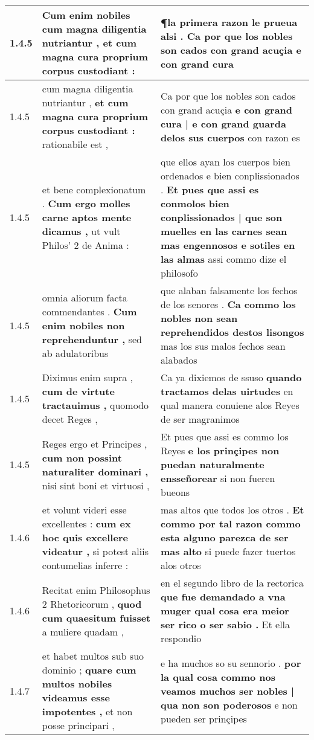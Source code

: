 \begin{tabular}{|p{1cm}|p{6.5cm}|p{6.5cm}|}
1.4.5 & Cum enim nobiles \textbf{ cum magna diligentia nutriantur , } et cum magna cura proprium corpus custodiant : & ¶la primera razon le prueua alsi . \textbf{ Ca por que los nobles son cados con grand acuçia } e con grand cura \\\hline
1.4.5 & cum magna diligentia nutriantur , \textbf{ et cum magna cura proprium corpus custodiant : } rationabile est , & Ca por que los nobles son cados con grand acuçia \textbf{ e con grand cura | e con grand guarda delos sus cuerpos } con razon es \\\hline
1.4.5 & et bene complexionatum . \textbf{ Cum ergo molles carne aptos mente dicamus , } ut vult Philos’ 2 de Anima : & que ellos ayan los cuerpos bien ordenados e bien conplissionados . \textbf{ Et pues que assi es conmolos bien conplissionados | que son muelles en las carnes sean mas engennosos e sotiles en las almas } assi commo dize el philosofo \\\hline
1.4.5 & omnia aliorum facta commendantes . \textbf{ Cum enim nobiles non reprehenduntur , } sed ab adulatoribus & que alaban falsamente los fechos de los senores . \textbf{ Ca commo los nobles non sean reprehendidos destos lisongos } mas los sus malos fechos sean alabados \\\hline
1.4.5 & Diximus enim supra , \textbf{ cum de virtute tractauimus , } quomodo decet Reges , & Ca ya dixiemos de ssuso \textbf{ quando tractamos delas uirtudes } en qual manera conuiene alos Reyes de ser magranimos \\\hline
1.4.5 & Reges ergo et Principes , \textbf{ cum non possint naturaliter dominari , } nisi sint boni et virtuosi , & Et pues que assi es commo los Reyes \textbf{ e los prinçipes non puedan naturalmente ensseñorear } si non fueren bueons \\\hline
1.4.6 & et volunt videri esse excellentes : \textbf{ cum ex hoc quis excellere videatur , } si potest aliis contumelias inferre : & mas altos que todos los otros . \textbf{ Et commo por tal razon commo esta alguno parezca de ser mas alto } si puede fazer tuertos alos otros \\\hline
1.4.6 & Recitat enim Philosophus 2 Rhetoricorum , \textbf{ quod cum quaesitum fuisset } a muliere quadam , & en el segundo libro de la rectorica \textbf{ que fue demandado a vna muger qual cosa era meior ser rico o ser sabio . } Et ella respondio \\\hline
1.4.7 & et habet multos sub suo dominio ; \textbf{ quare cum multos nobiles videamus esse impotentes , } et non posse principari , & e ha muchos so su sennorio . \textbf{ por la qual cosa commo nos veamos muchos ser nobles | qua non son poderosos } e non pueden ser prinçipes \\\hline

\end{tabular}
